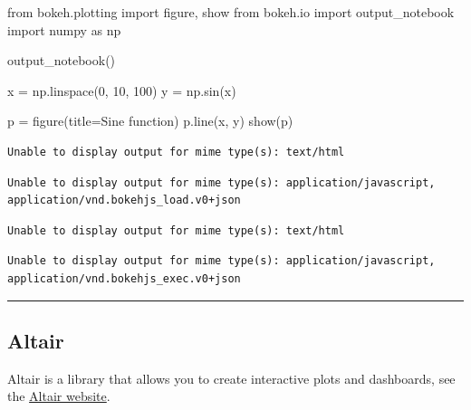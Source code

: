 \documentclass[
  letterpaper,
  DIV=11,
  numbers=noendperiod]{scrreprt}
\newenvironment{Shaded}{\begin{snugshade}}{\end{snugshade}}
\newcommand{\DecValTok}[1]{\textcolor[rgb]{0.68,0.00,0.00}{#1}}
\newcommand{\ImportTok}[1]{\textcolor[rgb]{0.00,0.46,0.62}{#1}}
\newcommand{\NormalTok}[1]{\textcolor[rgb]{0.00,0.23,0.31}{#1}}
\newcommand{\OperatorTok}[1]{\textcolor[rgb]{0.37,0.37,0.37}{#1}}
\newcommand{\StringTok}[1]{\textcolor[rgb]{0.13,0.47,0.30}{#1}}
\begin{document}
\begin{Shaded}
\begin{Highlighting}[]
\ImportTok{from}\NormalTok{ bokeh.plotting }\ImportTok{import}\NormalTok{ figure, show}
\ImportTok{from}\NormalTok{ bokeh.io }\ImportTok{import}\NormalTok{ output\_notebook}
\ImportTok{import}\NormalTok{ numpy }\ImportTok{as}\NormalTok{ np}

\NormalTok{output\_notebook()}

\NormalTok{x }\OperatorTok{=}\NormalTok{ np.linspace(}\DecValTok{0}\NormalTok{, }\DecValTok{10}\NormalTok{, }\DecValTok{100}\NormalTok{)}
\NormalTok{y }\OperatorTok{=}\NormalTok{ np.sin(x)}

\NormalTok{p }\OperatorTok{=}\NormalTok{ figure(title}\OperatorTok{=}\StringTok{\textquotesingle{}Sine function\textquotesingle{}}\NormalTok{)}
\NormalTok{p.line(x, y)}
\NormalTok{show(p)}
\end{Highlighting}
\end{Shaded}

\begin{verbatim}
Unable to display output for mime type(s): text/html
\end{verbatim}

\begin{verbatim}
Unable to display output for mime type(s): application/javascript, application/vnd.bokehjs_load.v0+json
\end{verbatim}

\begin{verbatim}
Unable to display output for mime type(s): text/html
\end{verbatim}

\begin{verbatim}
Unable to display output for mime type(s): application/javascript, application/vnd.bokehjs_exec.v0+json
\end{verbatim}

\begin{center}\rule{0.5\linewidth}{0.5pt}\end{center}

\subsection*{Altair}\label{altair}

Altair is a library that allows you to create interactive plots and
dashboards, see the \href{https://altair-viz.github.io/}{Altair
website}.
\end{document}
